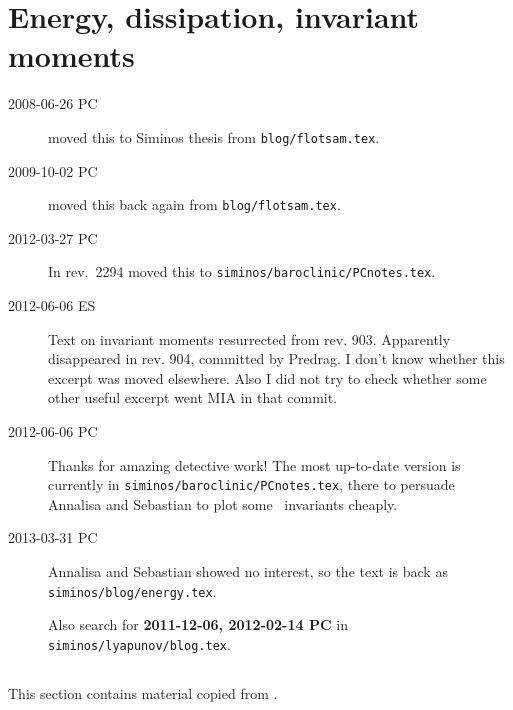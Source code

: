 
\chapter{Energy, dissipation, invariant moments}
\label{c-energy}

\renewcommand{\ssp}{x}             %

\ifboyscout
\begin{description}
\item[2008-06-26 PC] moved this to Siminos thesis from
        \texttt{blog/flotsam.tex}.
\item[2009-10-02 PC] moved this back again from
        \texttt{blog/flotsam.tex}.
\item[2012-03-27 PC] In rev.~2294 moved this to
        \texttt{siminos/baroclinic/PCnotes.tex}.
\item[2012-06-06 ES]
Text on invariant moments resurrected from rev. 903. Apparently
disappeared in rev. 904, committed by Predrag. I don't know whether this
excerpt was moved elsewhere. Also I did not try to check whether some
other useful excerpt went MIA in that commit.

\item[2012-06-06 PC] Thanks for amazing detective work! The most
up-to-date version is currently in
\texttt{siminos/baroclinic/PCnotes.tex}, there to persuade Annalisa
and Sebastian to plot some \statesp\ invariants cheaply.

\item[2013-03-31 PC] Annalisa and Sebastian showed no interest, so
the text is back as \texttt{siminos/blog/energy.tex}.

Also search for {\bf 2011-12-06, 2012-02-14 PC} in
\texttt{siminos/lyapunov/blog.tex}.

\end{description}
\fi

\section{\KSe}
\label{s-KS}

\ifboyscout
This section contains material copied from .
\fi

